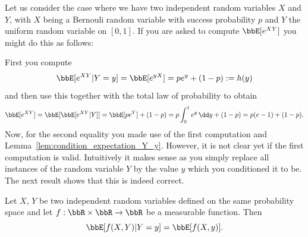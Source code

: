 Let us consider the case where we have two independent random variables $X$ and $Y$, with $X$ being a Bernouli random variable with success probability $p$ and $Y$ the uniform random variable on $[0,1]$. If you are asked to compute $\bbE[e^{XY}]$ you might do this as follows:

First you compute
\[
	\bbE[e^{XY} | Y = y] = \bbE[e^{yX}] = pe^{y} + (1-p) := h(y)
\]
and then use this together with the total law of probability to obtain
\[
	\bbE[e^{XY}] = \bbE[\bbE[e^{XY}|Y]] = \bbE[pe^Y] + (1-p) = p \int_0^1 e^{y} \, \dd y + (1-p)
	= p(e - 1) + (1-p).
\]
Now, for the second equality you made use of the first computation and Lemma~\ref{lem:condition_expectation_Y_y}. However, it is not clear yet if the first computation is valid. Intuitively it makes sense as you simply replace all instances of the random variable $Y$ by the value $y$ which you conditioned it to be. The next result shows that this is indeed correct.

\begin{lemma}\label{lem:computing_conditional_expectations}
Let $X$, $Y$ be two independent random variables defined on the same probability space and let $f : \bbR \times \bbR \to \bbR$ be a measurable function. Then
\[
	\bbE[f(X,Y) | Y = y] = \bbE[f(X,y)].
\]
\end{lemma}

